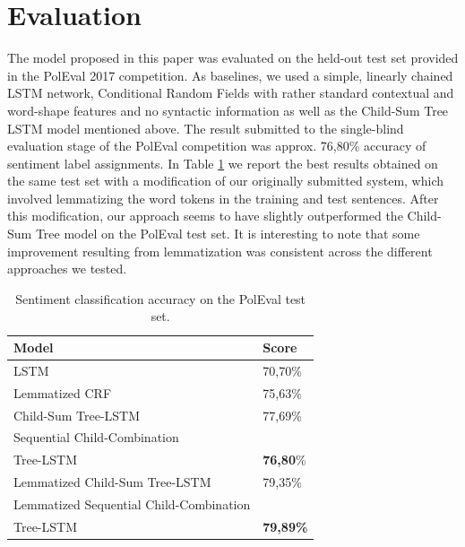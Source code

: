 \documentclass[10pt, a4paper]{article}
\begin{document}
\section{Evaluation} 
	The model proposed in this paper was evaluated on the held-out test set provided in the PolEval 2017 competition. As baselines, we used a simple, linearly chained LSTM network, Conditional Random Fields \cite{lafferty2001conditional} with rather standard contextual and word-shape features and no syntactic information as well as the Child-Sum Tree LSTM model mentioned above. The result submitted to the single-blind evaluation stage of the PolEval competition was approx. 76,80\% accuracy of sentiment label assignments. In Table \ref{tab:evaluation} we report the best results obtained on the same test set with a modification of our originally submitted system, which involved lemmatizing the word tokens in the training and test sentences. After this modification, our approach seems to have slightly outperformed the Child-Sum Tree model on the PolEval test set. It is interesting to note that some improvement resulting from lemmatization was consistent across the different approaches we tested.
\begin{table}[h]
 \begin{center}
\begin{tabular}{|l|l|}

      \hline
      Model & Score\\
      \hline
      \hline
      LSTM &70,70\%\\
      \hline
      Lemmatized CRF & 75,63\%\\
      \hline
      Child-Sum Tree-LSTM &  77,69\%\\
      \hline
      Sequential Child-Combination & \\
      Tree-LSTM & \textbf{76,80}\%\\
      \hline
      Lemmatized Child-Sum Tree-LSTM & 79,35\%\\
      \hline
      Lemmatized Sequential Child-Combination & \\
      Tree-LSTM & \textbf{79,89\%} \\
      \hline
\end{tabular}
\caption{Sentiment classification accuracy on the PolEval test set.}
\label{tab:evaluation}
 \end{center}
\end{table}
\end{document}
